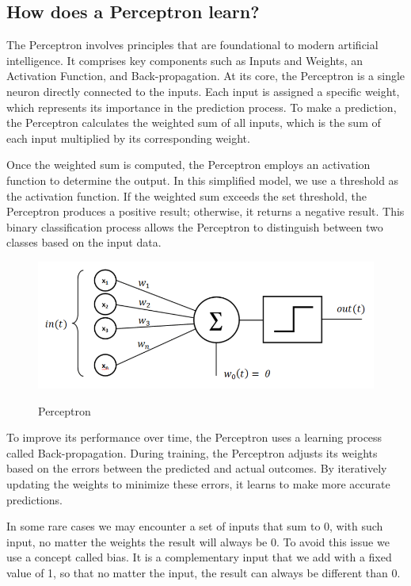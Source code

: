 \documentclass{article}
\begin{document}
\newpage

\subsection{How does a Perceptron learn?}

The Perceptron involves principles that are foundational to modern artificial intelligence. It comprises key components such as Inputs and Weights, an Activation Function, and Back-propagation. At its core, the Perceptron is a single neuron directly connected to the inputs. Each input is assigned a specific weight, which represents its importance in the prediction process. To make a prediction, the Perceptron calculates the weighted sum of all inputs, which is the sum of each input multiplied by its corresponding weight.

Once the weighted sum is computed, the Perceptron employs an activation function to determine the output. In this simplified model, we use a threshold as the activation function. If the weighted sum exceeds the set threshold, the Perceptron produces a positive result; otherwise, it returns a negative result. This binary classification process allows the Perceptron to distinguish between two classes based on the input data.

\begin{figure}[ht]
    \caption*{Perceptron}
    \centering
    \includegraphics[width=0.75\linewidth]{assets/perceptron/perceptron.png}
    \label{fig:perceptron}
\end{figure}
To improve its performance over time, the Perceptron uses a learning process called Back-propagation. During training, the Perceptron adjusts its weights based on the errors between the predicted and actual outcomes. By iteratively updating the weights to minimize these errors, it learns to make more accurate predictions. 

In some rare cases we may encounter a set of inputs that sum to 0, with such input, no matter the weights the result will always be 0. To avoid this issue we use a concept called bias. It is a complementary input that we add with a fixed value of 1, so that no matter the input, the result can always be different than 0.
\end{document}
